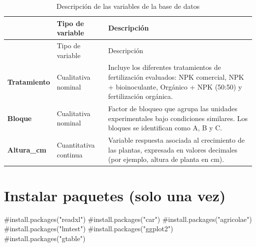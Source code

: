 \documentclass[
  spanish,
  letterpaper,
  DIV=11,
  numbers=noendperiod]{scrreprt}
\newenvironment{Shaded}{\begin{snugshade}}{\end{snugshade}}
\newcommand{\CommentTok}[1]{\textcolor[rgb]{0.37,0.37,0.37}{#1}}
\begin{document}
\begin{longtable}[]{@{}
  >{\raggedright\arraybackslash}p{}
  >{\raggedright\arraybackslash}p{}
  >{\raggedright\arraybackslash}p{}@{}}
\caption{Descripción de las variables de la base de
datos}\label{tbl-dbca}\tabularnewline
\toprule\noalign{}
\begin{minipage}[b]{\linewidth}\raggedright
\end{minipage} & \begin{minipage}[b]{\linewidth}\raggedright
Tipo de variable
\end{minipage} & \begin{minipage}[b]{\linewidth}\raggedright
Descripción
\end{minipage} \\
\midrule\noalign{}
\endfirsthead
\toprule\noalign{}
\begin{minipage}[b]{\linewidth}\raggedright
\end{minipage} & \begin{minipage}[b]{\linewidth}\raggedright
Tipo de variable
\end{minipage} & \begin{minipage}[b]{\linewidth}\raggedright
Descripción
\end{minipage} \\
\midrule\noalign{}
\endhead
\bottomrule\noalign{}
\endlastfoot
\textbf{Tratamiento} & Cualitativa nominal & Incluye los diferentes
tratamientos de fertilización evaluados: NPK comercial, NPK +
bioinoculante, Orgánico + NPK (50:50) y fertilización orgánica. \\
\textbf{Bloque} & Cualitativa nominal & Factor de bloqueo que agrupa las
unidades experimentales bajo condiciones similares. Los bloques se
identifican como A, B y C. \\
\textbf{Altura\_cm} & Cuantitativa continua & Variable respuesta
asociada al crecimiento de las plantas, expresada en valores decimales
(por ejemplo, altura de planta en cm). \\
\end{longtable}

\section{Instalar paquetes (solo una
vez)}\label{instalar-paquetes-solo-una-vez}

\begin{Shaded}
\begin{Highlighting}[]
\CommentTok{\#install.packages("readxl")}
\CommentTok{\#install.packages("car") }
\CommentTok{\#install.packages("agricolae") }
\CommentTok{\#install.packages("lmtest") }
\CommentTok{\#install.packages("ggplot2")}
\CommentTok{\#install.packages("gtable")}
\end{Highlighting}
\end{Shaded}
\end{document}
